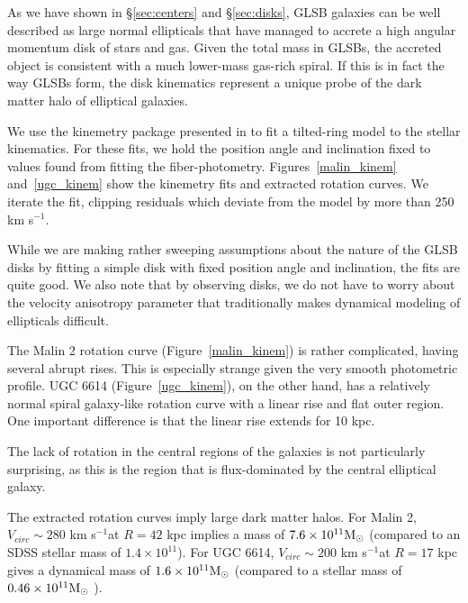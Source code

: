 \documentclass{emulateapj}
\newcommand\msun{\rm{M}_\odot}
\newcommand\kms{km s$^{-1}$}
\newcommand\HI{\ion{H}{1}}
\begin{document}

As we have shown in \S\ref{sec:centers} and \S\ref{sec:disks}, GLSB galaxies can be well described as large normal ellipticals that have managed to accrete a high angular momentum disk of stars and gas.  Given the total \HI mass in GLSBs, the accreted object is consistent with a much lower-mass gas-rich spiral.  If this is in fact the way GLSBs form, the disk kinematics represent a unique probe of the dark matter halo of elliptical galaxies.

We use the kinemetry package presented in \citet{Krajn06} to fit a tilted-ring model to the stellar kinematics.  For these fits, we hold the position angle and inclination fixed to values found from fitting the fiber-photometry.  Figures~\ref{malin_kinem} and~\ref{ugc_kinem} show the kinemetry fits and extracted rotation curves.  We iterate the fit, clipping residuals which deviate from the model by more than 250 \kms.  

While we are making rather sweeping assumptions about the nature of the GLSB disks by fitting a simple disk with fixed position angle and inclination, the fits are quite good.  We also note that by observing disks, we do not have to worry about the velocity anisotropy parameter that traditionally makes dynamical modeling of ellipticals difficult.

The Malin 2 rotation curve (Figure~\ref{malin_kinem}) is rather complicated, having several abrupt rises.  This is especially strange given the very smooth photometric profile.  UGC 6614 (Figure~\ref{ugc_kinem}), on the other hand, has a relatively normal spiral galaxy-like rotation curve with a linear rise and flat outer region.  One important difference is that the linear rise extends for 10 kpc.

The lack of rotation in the central regions of the galaxies is not particularly surprising, as this is the region that is flux-dominated by the central elliptical galaxy.  

The extracted rotation curves imply large dark matter halos.  For Malin 2, $V_{circ}\sim 280$ \kms at $R=42$ kpc implies a mass of $7.6\times 10^{11} \msun$ (compared to an SDSS stellar mass of $1.4\times 10^{11}$).  For UGC 6614, $V_{circ}\sim 200$ \kms at $R=17$ kpc gives a dynamical mass of $1.6\times 10^{11} \msun$ (compared to a stellar mass of $0.46\times 10^{11} \msun$ ).  
\end{document}
